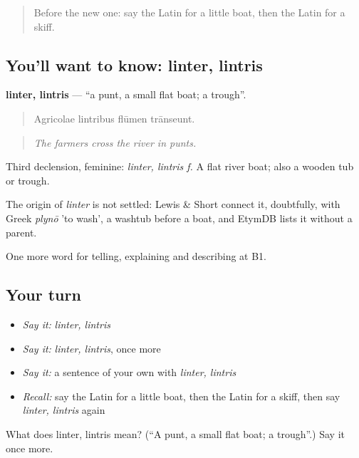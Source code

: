 \begin{quote}
Before the new one: say the Latin for a little boat, then the Latin for a skiff.
\end{quote}

\subsection*{You'll want to know: linter, lintris}
\textbf{linter, lintris} — \textquotedblleft{}a punt, a small flat boat; a trough\textquotedblright{}.

\begin{quote}
Agricolae lintribus flūmen trānseunt.
\end{quote}

\begin{quote}
\emph{The farmers cross the river in punts.}
\end{quote}

Third declension, feminine: \emph{linter, lintris f.} A flat river boat; also a wooden tub or trough.

\begin{cousinweb}
The origin of \emph{linter} is not settled: Lewis \& Short connect it, doubtfully, with Greek \emph{plynō} 'to wash', a washtub before a boat, and EtymDB lists it without a parent.
\end{cousinweb}

\begin{grammarlens}[title={What you've built}]
One more word for telling, explaining and describing at B1.
\end{grammarlens}

\subsection*{Your turn}
\begin{itemize}
\raggedright
  \item \emph{Say it:} \emph{linter, lintris}
  \item \emph{Say it:} \emph{linter, lintris}, once more
  \item \emph{Say it:} a sentence of your own with \emph{linter, lintris}
  \item \emph{Recall:} say the Latin for a little boat, then the Latin for a skiff, then say \emph{linter, lintris} again
\end{itemize}

\begin{tcolorbox}[breakable,colback=teal!4,colframe=teal!35!black,title={Before you move on}]
What does linter, lintris mean? (\textquotedblleft{}A punt, a small flat boat; a trough\textquotedblright{}.) Say it once more.
\end{tcolorbox}
